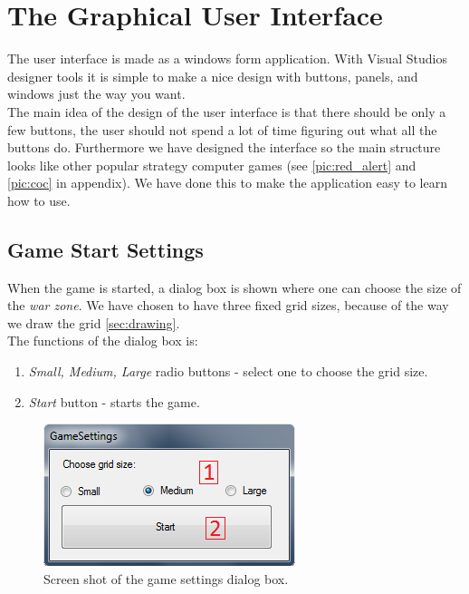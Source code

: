 \section{The Graphical User Interface}
The user interface is made as a windows form application. With Visual Studios designer tools it is simple to make a nice design with buttons, panels, and windows just the way you want.\\
   The main idea of the design of the user interface is that there should be only a few buttons, the user should not spend a lot of time figuring out what all the buttons do. Furthermore we have designed the interface so the main structure looks like other popular strategy computer games (see \ref{pic:red_alert} and \ref{pic:coc} in appendix). We have done this to make the application easy to learn how to use.
	
\subsection*{Game Start Settings}
When the game is started, a dialog box is shown where one can choose the size of the \textit{war zone}. We have chosen to have three fixed grid sizes, because of the way we draw the grid \ref{sec:drawing}.\\
   The functions of the dialog box is:
\begin{enumerate}
	\item \textit{Small, Medium, Large} radio buttons - select one to choose the grid size.
	\item \textit{Start} button - starts the game.
\end{enumerate}

\begin{figure}[H]
\begin{center}
\includegraphics[scale=0.9]{Images/dialog.png}
\end{center}
\caption{Screen shot of the game settings dialog box.}
\label{dialog}
\end{figure}

